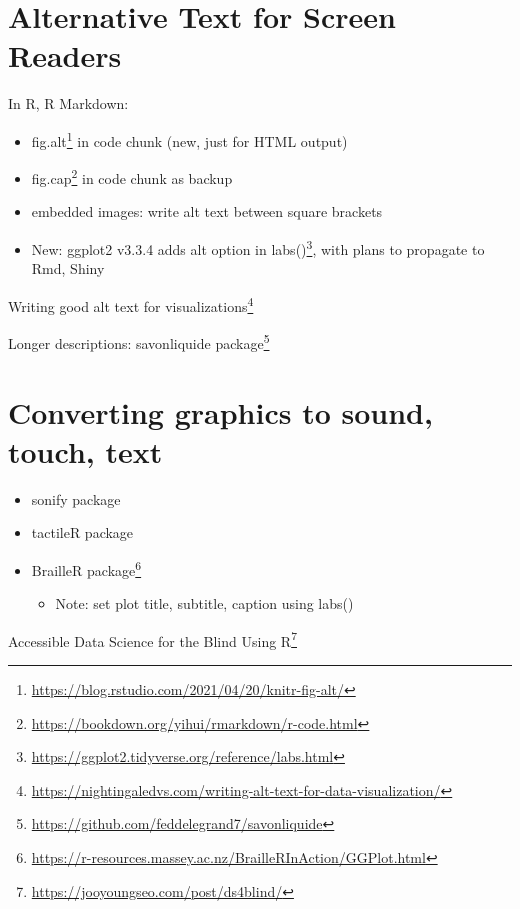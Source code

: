 \documentclass[
]{krantz}
\providecommand{\tightlist}{%
  \setlength{\itemsep}{0pt}\setlength{\parskip}{0pt}}
\renewcommand{\href}[2]{#2\footnote{\url{#1}}}
\begin{document}
\hypertarget{alternative-text-for-screen-readers}{%
\section{Alternative Text for Screen Readers}\label{alternative-text-for-screen-readers}}

In R, R Markdown:

\begin{itemize}
\item
  \href{https://blog.rstudio.com/2021/04/20/knitr-fig-alt/}{fig.alt} in code chunk (new, just for HTML output)
\item
  \href{https://bookdown.org/yihui/rmarkdown/r-code.html}{fig.cap} in code chunk as backup
\item
  embedded images: write alt text between square brackets
\item
  New: ggplot2 v3.3.4 adds \href{https://ggplot2.tidyverse.org/reference/labs.html}{alt option in labs()}, with plans to propagate to Rmd, Shiny
\end{itemize}

\href{https://nightingaledvs.com/writing-alt-text-for-data-visualization/}{Writing good alt text for visualizations}

Longer descriptions: \href{https://github.com/feddelegrand7/savonliquide}{savonliquide package}

\hypertarget{converting-graphics-to-sound-touch-text}{%
\section{Converting graphics to sound, touch, text}\label{converting-graphics-to-sound-touch-text}}

\begin{itemize}
\item
  sonify package
\item
  tactileR package
\item
  \href{https://r-resources.massey.ac.nz/BrailleRInAction/GGPlot.html}{BrailleR package}

  \begin{itemize}
  \tightlist
  \item
    Note: set plot title, subtitle, caption using labs()
  \end{itemize}
\end{itemize}

\href{https://jooyoungseo.com/post/ds4blind/}{Accessible Data Science for the Blind Using R}
\end{document}
